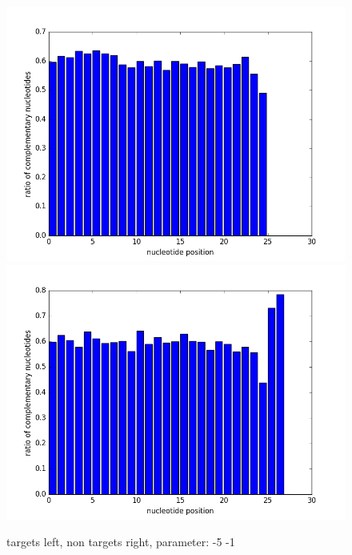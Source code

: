 \documentclass[12pt]{article}
\begin{document}
\begin{figure}
\includegraphics[scale=0.2]{results/ratio-5-1.png}
\includegraphics[scale=0.2]{results/non-ratio-5-1.png}
\caption {targets left, non targets right, parameter: -5 -1}
\label{fig:plot1}
\end{figure}
\end{document}
